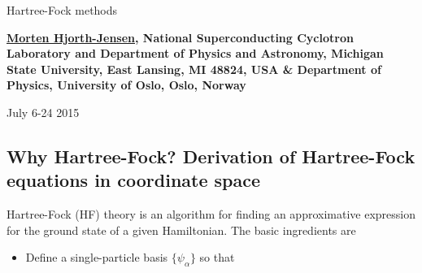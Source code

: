 \documentclass[%
oneside,                 %
final,                   %
10pt]{article}
\begin{document}






\thispagestyle{empty}

\begin{center}
{\LARGE\bf
\begin{spacing}{1.25}
Hartree-Fock methods
\end{spacing}
}
\end{center}


\begin{center}
{\bf \href{{http://computationalphysics.no}}{Morten Hjorth-Jensen}, National Superconducting Cyclotron Laboratory and Department of Physics and Astronomy, Michigan State University, East Lansing, MI 48824, USA {\&} Department of Physics, University of Oslo, Oslo, Norway${}^{}$} \\ [0mm]
\end{center}

\begin{center}
\end{center}
    

\begin{center} %
July 6-24 2015
\end{center}

\vspace{1cm}


\tableofcontents


\vspace{1cm} %




\subsection{Why Hartree-Fock? Derivation of Hartree-Fock equations in coordinate space}

Hartree-Fock (HF) theory is an algorithm for finding an approximative expression for the ground state of a given Hamiltonian. The basic ingredients are
\begin{itemize}
  \item Define a single-particle basis $\{\psi_{\alpha}\}$ so that
\end{itemize}
\end{document}
